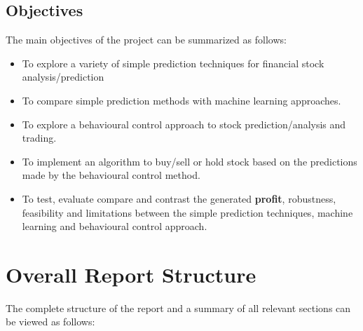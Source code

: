 \subsection {Objectives}

The main objectives of the project can be summarized as follows:

\begin{itemize}
    \item To explore a variety of simple prediction techniques for financial stock analysis/prediction
    \item To compare simple prediction methods with  machine learning approaches.
    \item To explore a behavioural control approach to stock prediction/analysis and trading.
    \item To implement an algorithm to buy/sell or hold stock based on the predictions made by the behavioural control method.
    \item To test, evaluate compare and contrast the generated \textbf{profit}, robustness, feasibility and limitations between the simple prediction techniques, machine learning and behavioural control approach.
\end{itemize}

\section{Overall Report Structure}

The complete structure of the report and a summary of all relevant sections can be viewed as follows:

